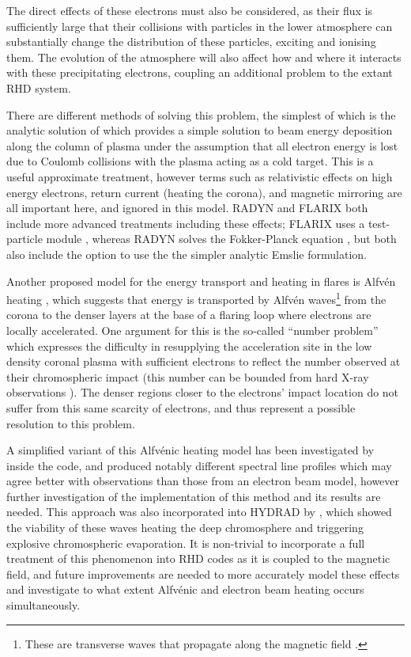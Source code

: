 The direct effects of these electrons must also be considered, as their flux is sufficiently large that their collisions with particles in the lower atmosphere can substantially change the distribution of these particles, exciting and ionising them.
The evolution of the atmosphere will also affect how and where it interacts with these precipitating electrons, coupling an additional problem to the extant RHD system.

There are different methods of solving this problem, the simplest of which is the analytic solution of \citet{Emslie1978} which provides a simple solution to beam energy deposition along the column of plasma under the assumption that all electron energy is lost due to Coulomb collisions with the plasma acting as a cold target.
This is a useful approximate treatment, however terms such as relativistic effects on high energy electrons, return current (heating the corona), and magnetic mirroring are all important here, and ignored in this model. RADYN and FLARIX both include more advanced treatments including these effects; FLARIX uses a test-particle module \NeedRef{}, whereas RADYN solves the Fokker-Planck equation \citep[e.g.][]{Hamilton1990}, but both also include the option to use the the simpler analytic Emslie formulation.

Another proposed model for the energy transport and heating in flares is Alfvén heating \citep{Emslie1982, Fletcher2007}, which suggests that energy is transported by Alfvén waves\footnote{These  are transverse waves that propagate along the magnetic field \citep{TandbergHanssen1988}.} from the corona to the denser layers at the base of a flaring loop where electrons are locally accelerated.
One argument for this is the so-called ``number problem'' which expresses the difficulty in resupplying the acceleration site in the low density coronal plasma with sufficient electrons to reflect the number observed at their chromospheric impact (this number can be bounded from hard X-ray observations \citep[e.g.][]{Simoes2013}).
The denser regions closer to the electrons' impact location do not suffer from this same scarcity of electrons, and thus represent a possible resolution to this problem.

A simplified variant of this Alfvénic heating model has been investigated by \citet{Kerr2016} inside the \Radyn{} code, and produced notably different spectral line profiles which may agree better with observations than those from an electron beam model, however further investigation of the implementation of this method and its results are needed.
This approach was also incorporated into HYDRAD by \citet{Reep2016}, which showed the viability of these waves heating the deep chromosphere and triggering explosive chromospheric evaporation.
It is non-trivial to incorporate a full treatment of this phenomenon into RHD codes as it is coupled to the magnetic field, and future improvements are needed to more accurately model these effects and investigate to what extent Alfvénic and electron beam heating occurs simultaneously.

